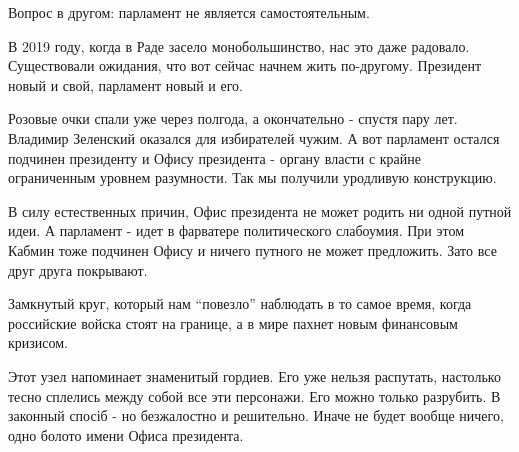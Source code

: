 Вопрос в другом: парламент не является самостоятельным.

В 2019 году, когда в Раде засело монобольшинство, нас это даже радовало.
Существовали ожидания, что вот сейчас начнем жить по-другому. Президент новый и
свой, парламент новый и его.

Розовые очки спали уже через полгода, а окончательно - спустя пару лет.
Владимир Зеленский оказался для избирателей чужим. А вот парламент остался
подчинен президенту и Офису президента - органу власти с крайне ограниченным
уровнем разумности. Так мы получили уродливую конструкцию.

В силу естественных причин, Офис президента не может родить ни одной путной
идеи. А парламент - идет в фарватере политического слабоумия. При этом Кабмин
тоже подчинен Офису и ничего путного не может предложить. Зато все друг друга
покрывают.

Замкнутый круг, который нам \enquote{повезло} наблюдать в то самое время, когда
российские войска стоят на границе, а в мире пахнет новым финансовым кризисом.

Этот узел напоминает знаменитый гордиев. Его уже нельзя распутать, настолько
тесно сплелись между собой все эти персонажи. Его можно только разрубить. В
законный спосіб - но безжалостно и решительно. Иначе не будет вообще ничего,
одно болото имени Офиса президента.

